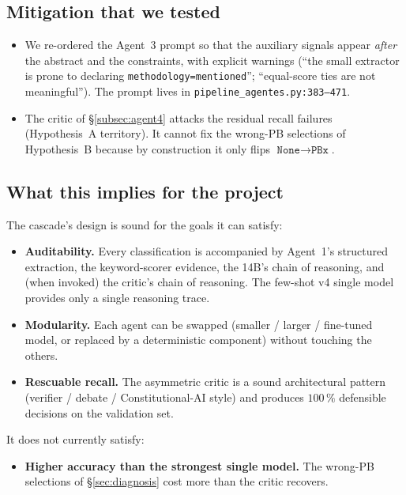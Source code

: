 \documentclass[11pt,a4paper]{article}
\begin{document}
\subsection{Mitigation that we tested}

\begin{itemize}\itemsep0pt
\item We re-ordered the Agent~3 prompt so that the auxiliary signals appear \emph{after} the abstract and the constraints, with explicit warnings (\enquote{the small extractor is prone to declaring \texttt{methodology=mentioned}}; \enquote{equal-score ties are not meaningful}). The prompt lives in \texttt{pipeline\_agentes.py:383--471}.
\item The critic of \S\ref{subsec:agent4} attacks the residual recall failures (Hypothesis~A territory). It cannot fix the wrong-PB selections of Hypothesis~B because by construction it only flips $\texttt{None}\rightarrow\texttt{PBx}$.
\end{itemize}

\subsection{What this implies for the project}

The cascade's design is sound for the goals it can satisfy:
\begin{itemize}\itemsep0pt
\item \textbf{Auditability.} Every classification is accompanied by Agent~1's structured extraction, the keyword-scorer evidence, the 14B's chain of reasoning, and (when invoked) the critic's chain of reasoning. The few-shot v4 single model provides only a single reasoning trace.
\item \textbf{Modularity.} Each agent can be swapped (smaller / larger / fine-tuned model, or replaced by a deterministic component) without touching the others.
\item \textbf{Rescuable recall.} The asymmetric critic is a sound architectural pattern (verifier / debate / Constitutional-AI style) and produces $100\,\%$ defensible decisions on the validation set.
\end{itemize}
It does not currently satisfy:
\begin{itemize}\itemsep0pt
\item \textbf{Higher accuracy than the strongest single model.} The wrong-PB selections of \S\ref{sec:diagnosis} cost more than the critic recovers.
\end{itemize}
\end{document}

